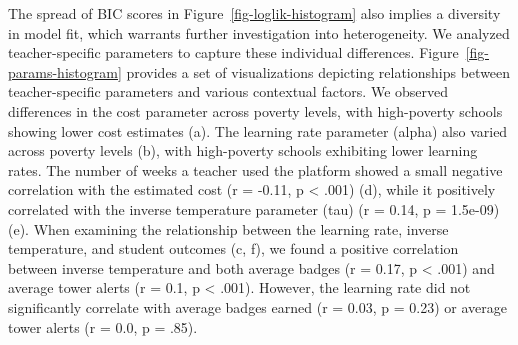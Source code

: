 \documentclass[
  number,
  preprint,
  3p,
  onecolumn]{elsarticle}
\begin{document}
The spread of BIC scores in Figure~\ref{fig-loglik-histogram} also
implies a diversity in model fit, which warrants further investigation
into heterogeneity. We analyzed teacher-specific parameters to capture
these individual differences. Figure~\ref{fig-params-histogram} provides
a set of visualizations depicting relationships between teacher-specific
parameters and various contextual factors. We observed differences in
the cost parameter across poverty levels, with high-poverty schools
showing lower cost estimates (a). The learning rate parameter (alpha)
also varied across poverty levels (b), with high-poverty schools
exhibiting lower learning rates. The number of weeks a teacher used the
platform showed a small negative correlation with the estimated cost (r
= -0.11, p \textless{} .001) (d), while it positively correlated with
the inverse temperature parameter (tau) (r = 0.14, p = 1.5e-09) (e).
When examining the relationship between the learning rate, inverse
temperature, and student outcomes (c, f), we found a positive
correlation between inverse temperature and both average badges (r =
0.17, p \textless{} .001) and average tower alerts (r = 0.1, p
\textless{} .001). However, the learning rate did not significantly
correlate with average badges earned (r = 0.03, p = 0.23) or average
tower alerts (r = 0.0, p = .85).
\end{document}
